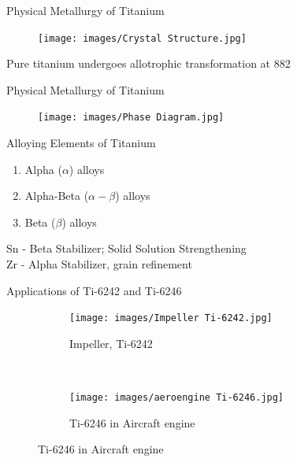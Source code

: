 \documentclass[10pt]{beamer}
\begin{document}
{%
\begin{frame}[fragile]{Physical Metallurgy of Titanium}

\begin{figure}[H]
    \centering
        \texttt{[image: images/Crystal Structure.jpg]}
\end{figure}

Pure titanium undergoes allotrophic transformation at 882 \degC

\end{frame}
}

{%

\begin{frame}[fragile]{Physical Metallurgy of Titanium}

\begin{figure}[H]
    \centering
        \texttt{[image: images/Phase Diagram.jpg]}
\end{figure}

\end{frame}
}

{%

\begin{frame}[fragile]{Alloying Elements of Titanium}

\begin{enumerate}
\item Alpha ($\alpha$) alloys
\item Alpha-Beta ($\alpha-\beta$) alloys
\item Beta ($\beta$) alloys
\end{enumerate}

Sn - Beta Stabilizer; Solid Solution Strengthening \\
Zr - Alpha Stabilizer, grain refinement
\end{frame}
}

{%
\begin{frame}[fragile]{Applications of Ti-6242 and Ti-6246}

\begin{figure}[H]
    \centering
    \begin{subfigure}{0.35\textwidth}
        \texttt{[image: images/Impeller Ti-6242.jpg]}
        \caption{Impeller, Ti-6242}
        \end{subfigure}
    ~
    \begin{subfigure}{0.45\textwidth}
        \texttt{[image: images/aeroengine Ti-6246.jpg]}
        \caption{Ti-6246 in Aircraft engine}
    \end{subfigure}
      
\end{figure}

\end{frame}
}
\end{document}
